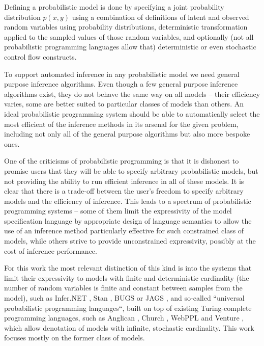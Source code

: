 \documentclass[12pt]{article}
\begin{document}
Defining a probabilistic model is done by specifying a joint probability distribution $p(x,y)$ using a combination of 
definitions of latent and observed random variables using probability distributions, 
deterministic transformation applied to the sampled values of those random variables, 
and optionally (not all probabilistic programming languages 
allow that) 
deterministic or even stochastic control flow constructs.  

To support automated inference in any probabilistic model we need general purpose inference algorithms.
Even though a few general purpose inference algorithms exist, they do not behave the same way on all models -- their efficiency varies, some are better suited to particular classes of models than others.
An ideal probabilistic programming system should be able to automatically select the most efficient of the inference methods in its arsenal for the given problem, including not only all of the general purpose algorithms but also more bespoke ones.

One of the criticisms of probabilistic programming is that it is dishonest to promise users that they will be able to specify arbitrary probabilistic models, but not providing the ability to run efficient inference in all of these models.
It is clear that there is a trade-off between the user's freedom to specify arbitrary models and the efficiency of inference.
This leads to a spectrum of probabilistic programming systems -- some of them limit the expressivity of the model specification language by appropriate design of language semantics to allow the use of an inference method particularly effective for such constrained class of models, while others strive to provide unconstrained expressivity, possibly at the cost of inference performance.

For this work the most relevant distinction of this kind is into the systems that limit their expressivity to models with finite and deterministic cardinality (the number of random variables is finite and constant between samples from the model), such as Infer.NET \citep{InferNET}, Stan \citep{Stan}, BUGS \citep{WinBUGS,BUGSproject} or JAGS \citep{JAGS}, 
and so-called ``universal probabilistic programming languages``, built on top of existing Turing-complete programming languages, such as Anglican \citep{anglican}, Church \citep{GoodmanEtAl2008}, WebPPL \citep{GoodmanStuhlmuller2014} and Venture \citep{venture},
which allow denotation of models with infinite, stochastic cardinality.
This work focuses mostly on the former class of models.
\end{document}
